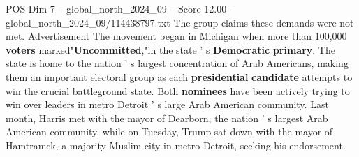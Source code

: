 \begin{textsample}{POS Dim 7 – global\_north\_2024\_09 – Score 12.00 – global\_north\_2024\_09/114438797.txt}
The group claims these demands were not met.
Advertisement The movement began in Michigan when more than 100,000 \textbf{voters} marked"\textbf{Uncommitted},"in the state ' s \textbf{Democratic} \textbf{primary}.
The state is home to the nation ' s largest concentration of Arab Americans, making them an important electoral group as each \textbf{presidential} \textbf{candidate} attempts to win the crucial battleground state.
Both \textbf{nominees} have been actively trying to win over leaders in metro Detroit ' s large Arab American community.
Last month, Harris met with the mayor of Dearborn, the nation ' s largest Arab American community, while on Tuesday, Trump sat down with the mayor of Hamtramck, a majority-Muslim city in metro Detroit, seeking his endorsement.

\end{textsample}

